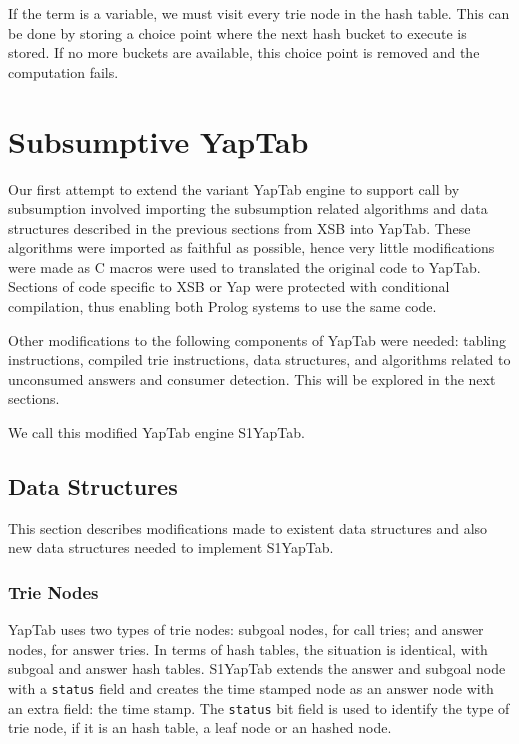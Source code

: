 If the term is a variable, we must visit every trie node in the hash table. This can be done
by storing a choice point where the next hash bucket to execute is stored. If no more
buckets are available, this choice point is removed and the computation fails.

\section{Subsumptive YapTab}

Our first attempt to extend the variant YapTab engine to support call by subsumption
involved importing the subsumption related algorithms and data structures described in
the previous sections from XSB into YapTab. These algorithms were imported as faithful as possible,
hence very little modifications were made as C macros were used to translated the original
code to YapTab. Sections of code specific to XSB or Yap were protected with conditional
compilation, thus enabling both Prolog systems to use the same code.

Other modifications to the following components of YapTab were needed:
tabling instructions, compiled trie instructions, data structures, and algorithms
related to unconsumed answers and consumer detection. This will be explored in the next sections.

We call this modified YapTab engine S1YapTab.

\subsection{Data Structures}

This section describes modifications made to existent data structures and also new 
data structures needed to implement S1YapTab.

\subsubsection{Trie Nodes}

YapTab uses two types of trie nodes: subgoal nodes, for call tries; and answer nodes, for
answer tries. In terms of hash tables, the situation is identical, with subgoal and answer
hash tables. S1YapTab extends the answer and subgoal node with a \texttt{status} field and
creates the time stamped node as an answer node with an extra field: the time stamp.
The \texttt{status} bit field is used to identify the type of trie node, if it is
an hash table, a leaf node or an hashed node.

